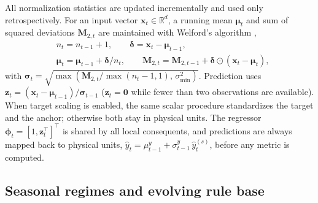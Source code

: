 \documentclass[preprint,12pt]{elsarticle}
\begin{document}
\label{subsec:online_feature_processing}
All normalization statistics are updated incrementally and used only retrospectively. For an input vector $\mathbf{x}_t \in \mathbb{R}^d$, a running mean $\boldsymbol{\mu}_t$ and sum of squared deviations $\mathbf{M}_{2,t}$ are maintained with Welford's algorithm \citep{welford1962note},
\begin{equation}
\begin{aligned}
&n_t = n_{t-1}+1,\qquad \boldsymbol{\delta} = \mathbf{x}_t - \boldsymbol{\mu}_{t-1},\\
&\boldsymbol{\mu}_t = \boldsymbol{\mu}_{t-1} + \boldsymbol{\delta}/n_t,\qquad
\mathbf{M}_{2,t} = \mathbf{M}_{2,t-1} + \boldsymbol{\delta}\odot(\mathbf{x}_t-\boldsymbol{\mu}_t),
\end{aligned}
\label{eq:online_scale_update}
\end{equation}
with $\boldsymbol{\sigma}_t = \sqrt{\max(\mathbf{M}_{2,t}/\max(n_t-1,1),\,\sigma_{\min}^2)}$. Prediction uses $\mathbf{z}_t = (\mathbf{x}_t - \boldsymbol{\mu}_{t-1})/\boldsymbol{\sigma}_{t-1}$ ($\mathbf{z}_t=\mathbf{0}$ while fewer than two observations are available). When target scaling is enabled, the same scalar procedure standardizes the target and the anchor; otherwise both stay in physical units. The regressor $\boldsymbol{\phi}_t = [1,\mathbf{z}_t^\top]^\top$ is shared by all local consequents, and predictions are always mapped back to physical units, $\widehat{y}_t = \mu^y_{t-1} + \sigma^y_{t-1}\,\widehat{y}_t^{(s)}$, before any metric is computed.

\subsection{Seasonal regimes and evolving rule base}
\label{subsec:seasonal_regimes}
\end{document}

